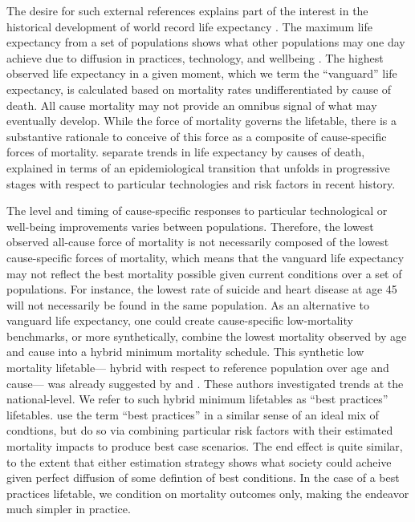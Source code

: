 \documentclass[11pt,oneside,a4paper]{article} %
\begin{document}
The desire for such external references explains part of the interest in the
historical development of world record life expectancy \citep{oeppen2002broken}.
The maximum life expectancy from a set of populations shows what other
populations may one day achieve due to diffusion in practices, technology, and
wellbeing \citep{vallin2010esperance}. The highest observed life expectancy in
a given moment, which we term the ``vanguard'' life expectancy, is calculated
based on mortality rates undifferentiated by cause of death. All cause mortality may not provide an omnibus signal of what may eventually develop. While the force of mortality governs the lifetable, there is a substantive rationale to conceive of
this force as a composite of cause-specific forces of mortality.
\citet{vallin2008minimum} separate trends in life expectancy by causes of death,
explained in terms of an epidemiological transition that unfolds in progressive
stages with respect to particular technologies and risk factors in recent
history. 

The level and timing of cause-specific responses to particular
technological or well-being improvements varies between populations. Therefore,
the lowest observed all-cause force of mortality is not necessarily composed of
the lowest cause-specific forces of mortality, which means that the vanguard life
expectancy may not reflect the best mortality possible given current conditions
over a set of populations. For instance, the lowest rate of suicide and heart
disease at age 45 will not necessarily be found in the same population. As an
alternative to vanguard life expectancy, one could create cause-specific
low-mortality benchmarks, or more synthetically, combine the lowest mortality
observed by age and cause into a hybrid minimum mortality schedule. This synthetic low mortality lifetable--- hybrid with respect to reference population over age and cause--- was already suggested by \citet{wunsch1975minimum} and \citet{vallin2008minimum}. These authors investigated trends at the national-level. We refer to such hybrid minimum
lifetables as ``best practices'' lifetables. \citet{eikemo2014} use the term
``best practices'' in a similar sense of an ideal mix of condtions, but do so via
combining particular risk factors with their estimated mortality impacts to
produce best case scenarios. The end effect is quite similar, to the extent that
either estimation strategy shows what society could acheive given perfect
diffusion of some defintion of best conditions. In the case of a best practices
lifetable, we condition on mortality outcomes only, making the endeavor much
simpler in practice.
\end{document}
